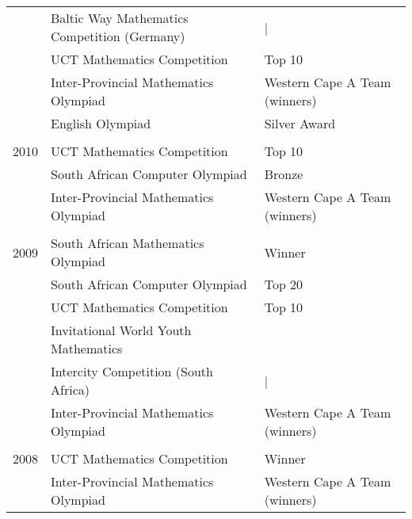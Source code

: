 \begin{tabular}{R{1cm}|ll}
& Baltic Way Mathematics Competition (Germany) &|\\
& UCT Mathematics Competition & Top 10\\
& Inter-Provincial Mathematics Olympiad&Western Cape A Team (winners)\\
& English Olympiad & Silver Award\\
&&\\
2010 & UCT Mathematics Competition & Top 10\\
& South African Computer Olympiad& Bronze\\
& Inter-Provincial Mathematics Olympiad&Western Cape A Team (winners)\\
&&\\
2009 & South African Mathematics Olympiad& Winner\\
& South African Computer Olympiad& Top 20\\
& UCT Mathematics Competition & Top 10\\
& Invitational World Youth Mathematics&\\
&\hspace{1cm} Intercity Competition (South Africa)&|\\
& Inter-Provincial Mathematics Olympiad&Western Cape A Team (winners)\\
&&\\
2008 & UCT Mathematics Competition & Winner\\
& Inter-Provincial Mathematics Olympiad&Western Cape A Team (winners)\\
\end{tabular}

